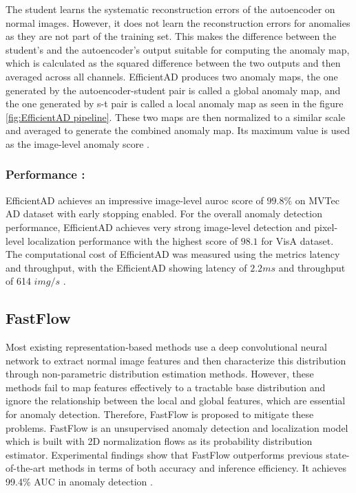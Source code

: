 The student learns the systematic reconstruction errors of the autoencoder on normal images. However, it does not learn the reconstruction errors for anomalies as they are not part of the training set. This makes the difference between the student's and the autoencoder's output suitable for computing the anomaly map, which is calculated as the squared difference between the two outputs and then averaged across all channels. EfficientAD produces two anomaly maps, the one generated by the autoencoder-student pair is called a global anomaly map, and the one generated by \gls{s-t} pair is called a local anomaly map as seen in the figure \ref{fig:EfficientAD pipeline}. These two maps are then normalized to a similar scale and averaged to generate the combined anomaly map. Its maximum value is used as the image-level anomaly score \cite{batzner2024efficientadaccuratevisualanomaly}.

\subsubsection*{Performance :}

EfficientAD achieves an impressive image-level \gls{auroc} score of $99.8\%$ on MVTec AD dataset\cite{8954181} with early stopping enabled. For the overall anomaly detection performance, EfficientAD achieves very strong image-level detection and pixel-level localization performance with the highest score of $98.1$ for VisA\cite{zou2022spotthedifferenceselfsupervisedpretraininganomaly} dataset. The computational cost of EfficientAD was measured using the metrics latency and throughput, with the EfficientAD showing latency of $2.2ms$ and throughput of 614 $img/s$ \cite{batzner2024efficientadaccuratevisualanomaly}.

\subsection{FastFlow}
\label{subsec:fastflow}

Most existing representation-based methods use a deep convolutional neural network to extract normal image features and then characterize this distribution through non-parametric distribution estimation methods. However, these methods fail to map features effectively to a tractable base distribution and ignore the relationship between the local and global features, which are essential for anomaly detection. Therefore, FastFlow is proposed to mitigate these problems. FastFlow is an unsupervised anomaly detection and localization model which is built with 2D normalization flows as its probability distribution estimator. Experimental findings show that FastFlow outperforms previous state-of-the-art methods in terms of both accuracy and inference efficiency. It achieves 99.4\% AUC in anomaly detection \cite{yu2021fastflowunsupervisedanomalydetection}.


